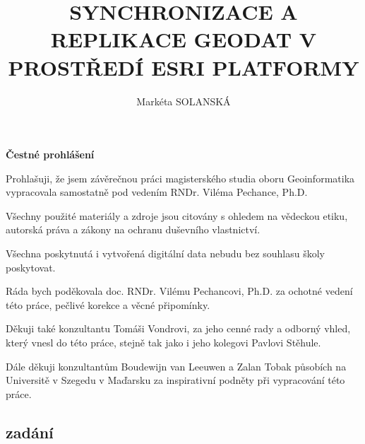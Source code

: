 \documentclass{thesisKGI}
\title{SYNCHRONIZACE A REPLIKACE GEODAT V PROSTŘEDÍ ESRI PLATFORMY}
\author{Markéta SOLANSKÁ}
\begin{document}
    \sloppy       %
    \maketitle    %


    \begin{declaration}
      \textbf{Čestné prohlášení}

      Prohlašuji, že jsem závěrečnou práci magisterského studia oboru Geoinformatika vypracovala samostatně pod vedením RNDr. Viléma Pechance, Ph.D.

      Všechny použité materiály a zdroje jsou citovány s ohledem na vědeckou etiku, autorská práva a zákony na ochranu duševního vlastnictví.

      Všechna poskytnutá i vytvořená digitální data nebudu bez souhlasu školy poskytovat.
    \end{declaration}

    
    \begin{dedication}

      Ráda bych poděkovala doc. RNDr. Vilému Pechancovi, Ph.D. za ochotné vedení této práce, pečlivé korekce a věcné připomínky.

      Děkuji také konzultantu Tomáši Vondrovi, za jeho cenné rady a odborný vhled, který vnesl do této práce, stejně tak jako i jeho kolegovi Pavlovi Stěhule.

      Dále děkuji konzultantům Boudewijn van Leeuwen a Zalan Tobak působích na Universitě v Szegedu v Maďarsku za inspirativní podněty při vypracování této práce. 
      \vspace{4em}
    \end{dedication}


    \newpage
    \begin{center}
    \section*{zadání}
    \end{center}
\end{document}
